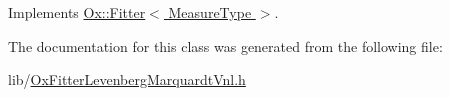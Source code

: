 Implements \hyperlink{class_ox_1_1_fitter_a8f240f0da86d06b339ab2747e87f21b9}{Ox\-::\-Fitter$<$ Measure\-Type $>$}.



The documentation for this class was generated from the following file\-:\begin{DoxyCompactItemize}
\item 
lib/\hyperlink{_ox_fitter_levenberg_marquardt_vnl_8h}{Ox\-Fitter\-Levenberg\-Marquardt\-Vnl.\-h}\end{DoxyCompactItemize}
